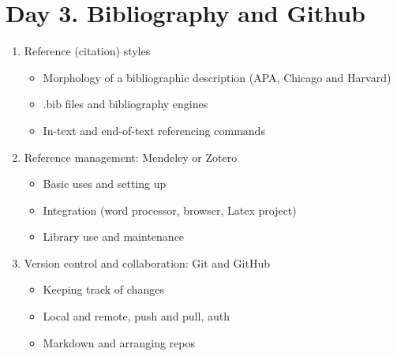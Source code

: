 \documentclass[a4paper,12pt]{article} %
\begin{document}
\section*{Day 3. Bibliography and Github}
\begin{enumerate}
	\item Reference (citation) styles
		\begin{itemize}
			\item Morphology of a bibliographic description (APA, Chicago and Harvard)
			\item .bib files and bibliography engines
			\item In-text and end-of-text referencing commands
		\end{itemize}%
	\item Reference management: Mendeley or Zotero
		\begin{itemize}
			\item Basic uses and setting up
			\item Integration (word processor, browser, Latex project)
			\item Library use and maintenance 
		\end{itemize}%
	\item Version control and collaboration: Git and GitHub
		\begin{itemize}
			\item Keeping track of changes
			\item Local and remote, push and pull, auth
			\item Markdown and arranging repos
		\end{itemize}
\end{enumerate}
\end{document}
